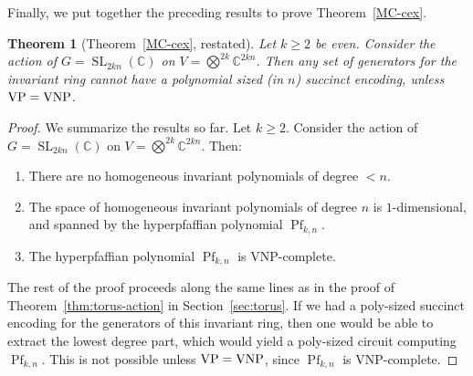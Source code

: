\documentclass[10pt,a4paper]{article}
\newtheorem{theorem}{Theorem}
\newcommand{\C}{\mathbb C}
\newcommand{\SL}{\operatorname{SL}}
\newcommand{\tensor}{\textstyle\bigotimes}
\DeclareMathOperator{\Pf}{Pf}
\begin{document}
\noindent
Finally, we put together the preceding results to prove Theorem~\ref{MC-cex}.

\begin{theorem}[Theorem~\ref{MC-cex}, restated]
Let $k \geq 2$ be even.
Consider the action of $G = \SL_{2kn}(\C)$ on $V = \tensor^{2k} \C^{2kn}$. Then any set of generators for the invariant ring cannot have a polynomial sized (in $n$) succinct encoding, unless ${\rm VP = VNP}$.
\end{theorem}
\begin{proof}

We summarize the results so far. Let $k \geq 2$. Consider the action of $G = \SL_{2kn}(\C)$ on $V = \tensor^{2k} \C^{2kn}$. Then:

\begin{enumerate}
\item There are no homogeneous invariant polynomials of degree $< n$.

\item The space of homogeneous invariant polynomials of degree $n$ is $1$-dimensional, and spanned by the hyperpfaffian polynomial $\Pf_{k,n}$.

\item The hyperpfaffian polynomial $\Pf_{k,n}$ is VNP-complete.
\end{enumerate}
The rest of the proof proceeds along the same lines as in the proof of Theorem~\ref{thm:torus-action} in Section~\ref{sec:torus}. If we had a poly-sized succinct encoding for the generators of this invariant ring, then one would be able to extract the lowest degree part, which would yield a poly-sized circuit computing $\Pf_{k,n}$.
This is not possible unless ${\rm VP = VNP}$, since $\Pf_{k,n}$ is VNP-complete.
\end{proof}
\end{document}
